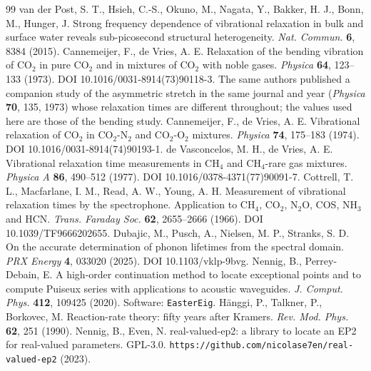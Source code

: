 \begin{thebibliography}{99}
 van der Post, S. T., Hsieh, C.-S., Okuno, M., Nagata, Y., Bakker, H. J., Bonn, M., Hunger, J. Strong frequency dependence of vibrational relaxation in bulk and surface water reveals sub-picosecond structural heterogeneity. \textit{Nat. Commun.} \textbf{6}, 8384 (2015).
 Cannemeijer, F., de Vries, A. E. Relaxation of the bending vibration of CO\(_2\) in pure CO\(_2\) and in mixtures of CO\(_2\) with noble gases. \textit{Physica} \textbf{64}, 123--133 (1973). DOI 10.1016/0031-8914(73)90118-3. The same authors published a companion study of the asymmetric stretch in the same journal and year (\textit{Physica} \textbf{70}, 135, 1973) whose relaxation times are different throughout; the values used here are those of the bending study.
 Cannemeijer, F., de Vries, A. E. Vibrational relaxation of CO\(_2\) in CO\(_2\)-N\(_2\) and CO\(_2\)-O\(_2\) mixtures. \textit{Physica} \textbf{74}, 175--183 (1974). DOI 10.1016/0031-8914(74)90193-1.
 de Vasconcelos, M. H., de Vries, A. E. Vibrational relaxation time measurements in CH\(_4\) and CH\(_4\)-rare gas mixtures. \textit{Physica A} \textbf{86}, 490--512 (1977). DOI 10.1016/0378-4371(77)90091-7.
 Cottrell, T. L., Macfarlane, I. M., Read, A. W., Young, A. H. Measurement of vibrational relaxation times by the spectrophone. Application to CH\(_4\), CO\(_2\), N\(_2\)O, COS, NH\(_3\) and HCN. \textit{Trans. Faraday Soc.} \textbf{62}, 2655--2666 (1966). DOI 10.1039/TF9666202655.
 Dubajic, M., Pusch, A., Nielsen, M. P., Stranks, S. D. On the accurate determination of phonon lifetimes from the spectral domain. \textit{PRX Energy} \textbf{4}, 033020 (2025). DOI 10.1103/vklp-9bvg.
 Nennig, B., Perrey-Debain, E. A high-order continuation method to locate exceptional points and to compute Puiseux series with applications to acoustic waveguides. \textit{J. Comput. Phys.} \textbf{412}, 109425 (2020). Software: \texttt{EasterEig}.
 H\"anggi, P., Talkner, P., Borkovec, M. Reaction-rate theory: fifty years after Kramers. \textit{Rev. Mod. Phys.} \textbf{62}, 251 (1990).
 Nennig, B., Even, N. real-valued-ep2: a library to locate an EP2 for real-valued parameters. GPL-3.0. \texttt{https://github.com/nicolase7en/real-valued-ep2} (2023).

\end{thebibliography}
